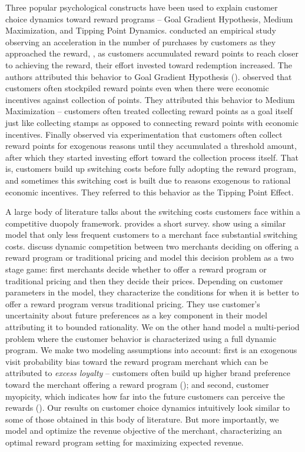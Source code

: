 Three popular psychological constructs have been used to explain customer choice dynamics toward reward programs -- Goal Gradient Hypothesis, Medium Maximization, and Tipping Point Dynamics.
\cite{kivetz2006goal} conducted an empirical study observing an acceleration in the number of purchases by customers as they approached the reward, \ie, as customers accumulated reward points to reach closer to achieving the reward, their effort invested toward redemption increased. 
The authors attributed this behavior to Goal Gradient Hypothesis (\cite{hull1932goal}).
\cite{stourm2015stockpiling, dreze2004using} observed that customers often stockpiled reward points even when there were economic incentives against collection of points. They attributed this behavior to Medium Maximization -- customers often treated collecting reward points as a goal itself just like collecting stamps as opposed to connecting reward points with economic incentives.
Finally \cite{gao2014influence} observed via experimentation that customers often collect reward points for exogenous reasons until they accumulated a threshold amount, after which they started investing effort toward the collection process itself.
That is, customers build up switching costs before fully adopting the reward program, and sometimes this switching cost is built due to reasons exogenous to rational economic incentives.
They referred to this behavior as the Tipping Point Effect.

A large body of literature talks about the switching costs customers face within a competitive duopoly framework.
\cite{villas2015short} provides a short survey.
\cite{hartmann2008frequency} show using a similar model that only less frequent customers to a merchant face substantial switching costs.
\cite{kopalle2001economic} discuss dynamic competition between two merchants deciding on offering a reward program or traditional pricing and model this decision problem as a two stage game: first merchants decide whether to offer a reward program or traditional pricing and then they decide their prices. 
Depending on customer parameters in the model, they characterize the conditions for when it is better to offer a reward program versus traditional pricing.
They use customer's uncertainity about future preferences as a key component in their model attributing it to bounded rationality.
We on the other hand model a multi-period problem where the customer behavior is characterized using a full dynamic program.
We make two modeling assumptions into account: first is an exogenous visit probability bias toward the reward program merchant which can be attributed to \emph{excess loyalty} -- customers often build up higher brand preference toward the merchant offering a reward program (\cite{fader1993excess, sharp1997loyalty}); 
and second, customer myopicity, which indicates how far into the future customers can perceive the rewards (\cite{liu2007long,lewis2004influence}).
Our results on customer choice dynamics intuitively look similar to some of those obtained in this body of literature.
But more importantly, we model and optimize the revenue objective of the merchant, characterizing an optimal reward program setting for maximizing expected revenue.
